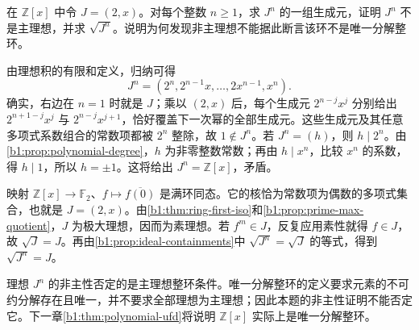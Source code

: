\begin{exercise}\label{b1:ex:11-nonprincipal-square}
	在 \(\mathbb Z[x]\) 中令 \(J=(2,x)\)。对每个整数 \(n\geq1\)，求 \(J^n\) 的一组生成元，证明 \(J^n\) 不是主理想，并求 \(\sqrt{J^n}\)。说明为何发现非主理想不能据此断言该环不是唯一分解整环。
\end{exercise}
\begin{solution}
	由理想积的有限和定义，归纳可得
	\[
		J^n=(2^n,2^{n-1}x,\ldots,2x^{n-1},x^n).
	\]
	确实，右边在 \(n=1\) 时就是 \(J\)；乘以 \((2,x)\) 后，每个生成元 \(2^{n-j}x^j\) 分别给出 \(2^{n+1-j}x^j\) 与 \(2^{n-j}x^{j+1}\)，恰好覆盖下一次幂的全部生成元。这些生成元及其任意多项式系数组合的常数项都被 \(2^n\) 整除，故 \(1\notin J^n\)。若 \(J^n=(h)\)，则 \(h\mid2^n\)。由\cref{b1:prop:polynomial-degree}，\(h\) 为非零整数常数；再由 \(h\mid x^n\)，比较 \(x^n\) 的系数，得 \(h\mid1\)，所以 \(h=\pm1\)。这将给出 \(J^n=\mathbb Z[x]\)，矛盾。

	映射 \(\mathbb Z[x]\rightarrow\mathbb F_2\)、\(f\mapsto\overline{f(0)}\) 是满环同态。它的核恰为常数项为偶数的多项式集合，也就是 \(J=(2,x)\)。由\cref{b1:thm:ring-first-iso}和\cref{b1:prop:prime-max-quotient}，\(J\) 为极大理想，因而为素理想。若 \(f^m\in J\)，反复应用素性就得 \(f\in J\)，故 \(\sqrt J=J\)。再由\cref{b1:prop:ideal-containments}中 \(\sqrt{J^n}=\sqrt J\) 的等式，得到 \(\sqrt{J^n}=J\)。

	理想 \(J^n\) 的非主性否定的是主理想整环条件。唯一分解整环的定义要求元素的不可约分解存在且唯一，并不要求全部理想为主理想；因此本题的非主性证明不能否定它。下一章\cref{b1:thm:polynomial-ufd}将说明 \(\mathbb Z[x]\) 实际上是唯一分解整环。
\end{solution}

